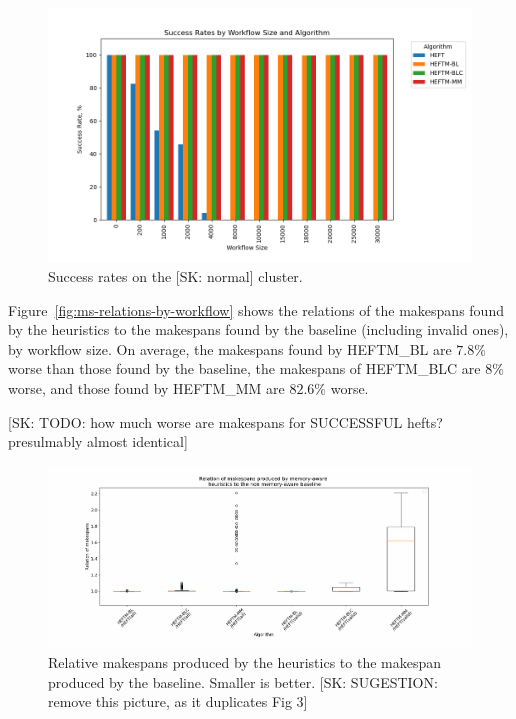 \documentclass[conference]{IEEEtran}
\newcommand{\algo}[1]{\textsc{#1}}
\newcommand{\heftmm}{\algo{HEFTM\_MM}\xspace}
\newcommand{\heftbl}{\algo{HEFTM\_BL}\xspace}
\newcommand{\heftblc}{\algo{HEFTM\_BLC}\xspace}
\newcommand{\skug}[1]{{\color{blue}[SK: #1]}}
\begin{document}
    \begin{figure}[tb]
        \centering
        \includegraphics[width=0.9\columnwidth] {images/success-rates-large}
        \caption{Success rates on the \skug{normal} cluster.}
        \label{fig:success-rates-large}
        \vspace{-0.3cm}
    \end{figure}

    Figure~\ref{fig:ms-relations-by-workflow} shows the relations of the makespans found by the heuristics to the
    makespans found by the baseline (including invalid ones), by workflow size.
    On average, the makespans found by \heftbl are $7.8\%$ worse than those found by the baseline, the makespans of \heftblc are $8\%$
    worse, and those found by \heftmm are $82.6\%$ worse.

    \skug{TODO: how much worse are makespans for SUCCESSFUL hefts? presulmably almost identical}


    \begin{figure}[tb]
        \centering
        \includegraphics[width=1.1\columnwidth] {images/MsRelations2}
        \caption{Relative makespans produced by the heuristics to the makespan produced by the baseline. Smaller is better.
        \skug{SUGESTION: remove this picture, as it duplicates Fig 3}
        }

        \label{fig:ms-relations}
        \vspace{-0.3cm}
    \end{figure}
\end{document}
